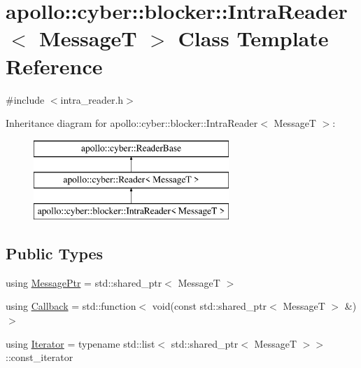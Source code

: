 \hypertarget{classapollo_1_1cyber_1_1blocker_1_1IntraReader}{\section{apollo\-:\-:cyber\-:\-:blocker\-:\-:Intra\-Reader$<$ Message\-T $>$ Class Template Reference}
\label{classapollo_1_1cyber_1_1blocker_1_1IntraReader}
}


{\ttfamily \#include $<$intra\-\_\-reader.\-h$>$}

Inheritance diagram for apollo\-:\-:cyber\-:\-:blocker\-:\-:Intra\-Reader$<$ Message\-T $>$\-:\begin{figure}[H]
\begin{center}
\leavevmode
\includegraphics[height=3.000000cm]{classapollo_1_1cyber_1_1blocker_1_1IntraReader}
\end{center}
\end{figure}
\subsection*{Public Types}
\begin{DoxyCompactItemize}
\item 
using \hyperlink{classapollo_1_1cyber_1_1blocker_1_1IntraReader_aa4e9071f397bee80ba4ab42e7d1f165d}{Message\-Ptr} = std\-::shared\-\_\-ptr$<$ Message\-T $>$
\item 
using \hyperlink{classapollo_1_1cyber_1_1blocker_1_1IntraReader_a15cf88ac9399d324aeb685bec11c8afe}{Callback} = std\-::function$<$ void(const std\-::shared\-\_\-ptr$<$ Message\-T $>$ \&)$>$
\item 
using \hyperlink{classapollo_1_1cyber_1_1blocker_1_1IntraReader_a34f048290fe0ff40e672a485835ccfc9}{Iterator} = typename std\-::list$<$ std\-::shared\-\_\-ptr$<$ Message\-T $>$$>$\-::const\-\_\-iterator
\end{DoxyCompactItemize}
